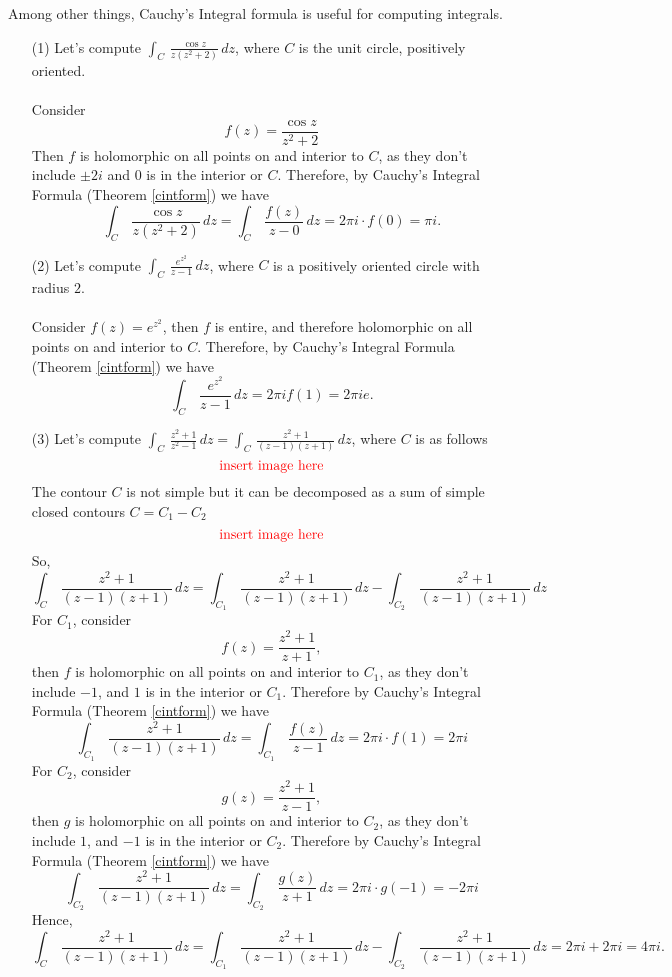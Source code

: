 Among other things, Cauchy's Integral formula is useful for computing integrals. 
\begin{example}\hfill
\begin{itemize}[itemsep=2em]
\item[(1)] Let's compute $\displaystyle \int_C\, \frac{\cos z}{z(z^2 + 2)}\, dz$, where $C$ is the unit circle, positively oriented.\\
\\
Consider
\[f(z) = \frac{\cos z}{z^2 + 2}\]
Then $f$ is holomorphic on all points on and interior to $C$, as they don't include $\pm 2i$ and $0$ is in the interior or $C$. Therefore, by Cauchy's Integral Formula (Theorem \ref{cintform}) we have
\[\int_C\, \frac{\cos z}{z(z^2 + 2)}\, dz = \int_C\, \frac{f(z)}{z - 0}\, dz = 2\pi i\cdot f(0) = \pi i.\]

\item[(2)] Let's compute $\displaystyle \int_C\, \frac{e^{z^2}}{z - 1}\, dz$, where $C$ is a positively oriented circle with radius $2$.\\
\\
Consider $f(z) = e^{z^2}$, then $f$ is entire, and therefore holomorphic on all points on and interior to $C$. Therefore, by Cauchy's Integral Formula (Theorem \ref{cintform}) we have
\[\int_C\, \frac{e^{z^2}}{z - 1}\, dz = 2\pi if(1) = 2\pi ie.\]

\item[(3)] Let's compute $\displaystyle \int_C\, \frac{z^2 + 1}{z^2 - 1}\, dz = \int_C\, \frac{z^2 + 1}{(z - 1)(z + 1)}\, dz$, where $C$ is as follows
\[\text{\color{red}insert image here}\]
The contour $C$ is not simple but it can be decomposed as a sum of simple closed contours $C = C_1 - C_2$
\[\text{\color{red}insert image here}\]
So, 
\[\int_C\, \frac{z^2 + 1}{(z - 1)(z + 1)}\,dz = \int_{C_1}\, \frac{z^2 + 1}{(z - 1)(z + 1)}\,dz - \int_{C_2}\, \frac{z^2 + 1}{(z - 1)(z + 1)}\,dz\]
For $C_1$, consider
\[f(z) = \frac{z^2 + 1}{z + 1},\]
then $f$ is holomorphic on all points on and interior to $C_1$, as they don't include $-1$, and $1$ is in the interior or $C_1$. Therefore by Cauchy's Integral Formula (Theorem \ref{cintform}) we have
\[\int_{C_1}\, \frac{z^2 + 1}{(z - 1)(z + 1)}\,dz = \int_{C_1}\, \frac{f(z)}{z - 1}\,dz = 2\pi i\cdot f(1) = 2\pi i\]
For $C_2$, consider
\[g(z) = \frac{z^2 + 1}{z - 1},\]
then $g$ is holomorphic on all points on and interior to $C_2$, as they don't include $1$, and $-1$ is in the interior or $C_2$. Therefore by Cauchy's Integral Formula (Theorem \ref{cintform}) we have
\[\int_{C_2}\, \frac{z^2 + 1}{(z - 1)(z + 1)}\,dz = \int_{C_2}\, \frac{g(z)}{z + 1}\,dz = 2\pi i\cdot g(-1) = -2\pi i\]
Hence, 
\[\int_C\, \frac{z^2 + 1}{(z - 1)(z + 1)}\,dz = \int_{C_1}\, \frac{z^2 + 1}{(z - 1)(z + 1)}\,dz - \int_{C_2}\, \frac{z^2 + 1}{(z - 1)(z + 1)}\,dz = 2\pi i + 2\pi i = 4\pi i.\]
\end{itemize}
\end{example}


